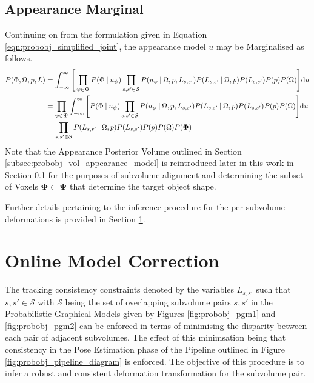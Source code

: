 \subsection{Appearance Marginal}
Continuing on from the formulation given in Equation
\ref{eqn:probobj_simplified_joint}, the appearance model $u$ may be Marginalised
as follows.
\begin{align}
  \label{eqn:probobj_appearanc_marginal}
  P(\Phi, \Omega, p, L) & =
  \int_{-\infty}^{\infty} \Bigg[ 
  \prod_{\psi \in \mathbf{\Psi}} P(\Phi \:\vert\: u_{\psi})
  \prod_{s, s' \in \mathcal{S}}P(u_{\psi} \:\vert\: \Omega, p, L_{s, s'})
  P(L_{s, s'} \:\vert\: \Omega, p) P(L_{s, s'})P(p)P(\Omega) \Bigg] {\mathrm d{u}} \\
  & = \prod_{\psi \in \mathbf{\Psi}} 
  \int_{-\infty}^{\infty} \Bigg[ P(\Phi \:\vert\: u_{\psi})
  \prod_{s, s' \in \mathcal{S}}P(u_{\psi} \:\vert\: \Omega, p, L_{s, s'})
  P(L_{s, s'} \:\vert\: \Omega, p) P(L_{s, s'})P(p)P(\Omega) \Bigg] {\mathrm d{u}} \\
  & = \prod_{s, s' \in \mathcal{S}} P(L_{s, s'} \:\vert\: \Omega, p)
  P(L_{s, s'})P(p)P(\Omega)P(\mathbf{\Phi})
\end{align}
Note that the Appearance Posterior Volume outlined in Section 
\ref{subsec:probobj_vol_appearance_model} is reintroduced later in this work in
Section \ref{} for the purposes of subvolume alignment and determining the
subset of Voxels $\mathbf{\Phi} \subset \mathbf{\Psi}$ that determine the target
object shape.

Further details pertaining to the inference procedure for the per-subvolume
deformations is provided in Section \ref{sec:probobj_model_correction}.

\section{Online Model Correction}
\label{sec:probobj_model_correction}
The tracking consistency constraints denoted by the variables $L_{s, s'}$ such
that $s, s' \in \mathcal{S}$ with $\mathcal{S}$ being the set of overlapping
subvolume pairs $s, s'$ in the Probabilistic Graphical Models given by Figures
\ref{fig:probobj_pgm1} and \ref{fig:probobj_pgm2} can be enforced in terms of
minimising the disparity between each pair of adjacent subvolumes. The effect of
this minimsation being that consistency in the Pose Estimation phase of the
Pipeline outlined in Figure \ref{fig:probobj_pipeline_diagram} is enforced. The
objective of this procedure is to infer a robust and consistent deformation
transformation for the subvolume pair.

